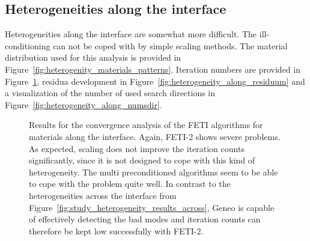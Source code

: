 \subsection{Heterogeneities along the interface}\label{sec:heterogeneities_along}
Heterogeneities along the interface are somewhat more difficult. The ill-conditioning can not be coped with by simple scaling methods. The material distribution used for this analysis is provided in Figure~\ref{fig:heterogenity_materials_patterns}. Iteration numbers are provided in Figure~\ref{fig:study_heterogeneity_results_along}, residua development in Figure~\ref{fig:heterogeneity_along_residuum} and a visualization of the number of used search directions in Figure~\ref{fig:heterogeneity_along_numsdir}.

\begin{figure}[tb]
  \begin{center}
    
    \caption[Study of heterogeneities along the interface: \# iterations]{Results for the convergence analysis of the FETI algorithms for materials along the interface. Again, FETI-2 shows severe problems. As expected, scaling does not improve the iteration counts significantly, since it is not designed to cope with this kind of heterogeneity. The multi preconditioned algorithms seem to be able to cope with the problem quite well. In contrast to the heterogeneities across the interface from Figure~\ref{fig:study_heterogeneity_results_across}, Geneo is capable of effectively detecting the bad modes and iteration counts can therefore be kept low successfully with FETI-2.}
    \label{fig:study_heterogeneity_results_along}
  \end{center}
\end{figure}

